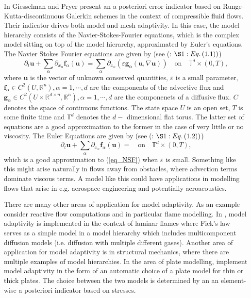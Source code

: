 \documentclass[12pt,a4paper]{article}
\theoremstyle{definition}
\begin{document}
In \cite{giesselmann2017posteriori} Giesselman and Pryer present an a posteriori error indicator based on Runge-Kutta-discontinuous Galerkin schemes in the context of compressible fluid flows.  Their indicator drives both model and mesh adaptivity.  In this case, the model hierarchy consists of the Navier-Stokes-Fourier equations, which is the complex model sitting on top of the model hierarchy, approximated by Euler's equations.   The Navier Stokes Fourier equations are given by (see (\cite{giesselmann2017posteriori}:  $\S 1: Eq. \left(1.1\right))$)
\begin{equation}\label{eq_NSF}
\partial_t\textbf{u} +\sum_{\alpha}\partial_{x_\alpha}\textbf{f}_{\alpha}\left(\textbf{u}\right) = \sum_{\alpha}\partial_{x_\alpha}  \left(\varepsilon \textbf{g}_{\alpha}\left(\textbf{u},\nabla\textbf{u}\right)\right)\quad \text{on} \quad \mathbb{T}^d \times \left(0,T\right),
\end{equation}
where $\textbf{u}$ is the vector of unknown conserved quantities, $\varepsilon$ is a small parameter, $\textbf{f}_{\alpha}\in C^2\left(U,\mathbb{R}^n\right), \alpha = 1,\cdots,d$ are the components of the advective flux and $\textbf{g}_{\alpha}\in C^2\left(U\times \mathbb{R}^{d\times n},\mathbb{R}^n\right), \alpha = 1,\cdots,d $ are the componenets of a diffusive flux.  $C$ denotes the space of continuous functions. The state space $U$ is an open set, $T$ is some finite time and $\mathbb{T}^d$ denotes the $d-$ dimensional flat torus. The latter set of equations are a good approximation to the former in the case of very little or no viscosity.  The Euler Equations are given by  (see (\cite{giesselmann2017posteriori}:  $\S 1: Eq. \left(1.2\right))$)
\begin{equation}
\partial_t\textbf{u} +\sum_{\alpha}\partial_{x_\alpha}\textbf{f}_{\alpha}\left(\textbf{u}\right) = \quad \text{on} \quad \mathbb{T}^d \times \left(0,T\right),
\end{equation}
which is a good approximation to (\ref{eq_NSF}) when $\varepsilon$ is small.  Something like this might arise naturally in flows away from obstacles, where advection terms dominate viscous terms.  A model like this could have applications in modelling flows that arise in e.g. aerospace engineering and potentially aeroacoustics. 

There are many other areas of application for model adaptivity.  As an example consider reactive flow computations and in particular flame modelling.  In \cite{becker2007mesh}, model adaptivity is implemented in the context of laminar flames where Fick's law serves as a simple model in a model hierarchy which includes multicomponent diffusion models (i.e. diffusion with multiple different gases).    
Another area of application for model adaptivity is in structural mechanics, where there are multiple examples of model hierarchies.  In the area of plate modelling, \cite{bohinc2009model} implement model adaptivity in the form of an automatic choice of a plate model for thin or thick plates.  The choice between the two models is determined by an an element-wise a posteriori indicator based on stresses. 
\end{document}
